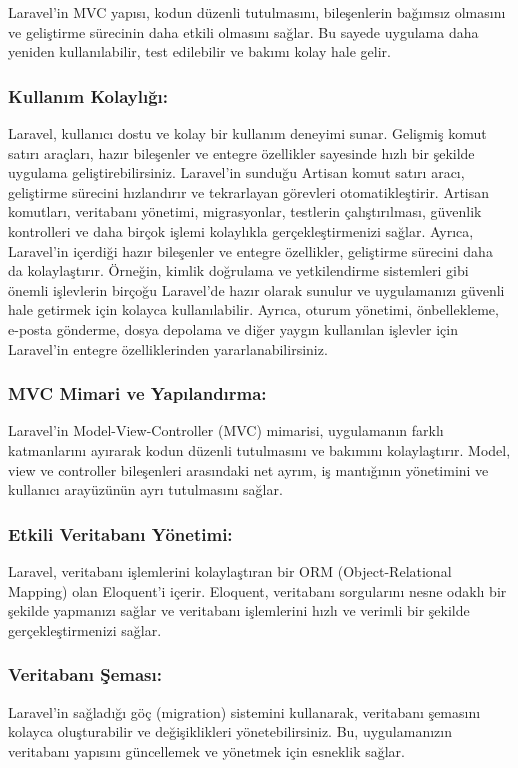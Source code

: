 Laravel'in MVC yapısı, kodun düzenli tutulmasını, bileşenlerin bağımsız olmasını ve geliştirme sürecinin daha etkili olmasını sağlar. Bu sayede uygulama daha yeniden kullanılabilir, test edilebilir ve bakımı kolay hale gelir.
\subsubsection{Kullanım Kolaylığı:}
Laravel, kullanıcı dostu ve kolay bir kullanım deneyimi sunar. Gelişmiş komut satırı araçları, hazır bileşenler ve entegre özellikler sayesinde hızlı bir şekilde uygulama geliştirebilirsiniz. Laravel'in sunduğu Artisan komut satırı aracı, geliştirme sürecini hızlandırır ve tekrarlayan görevleri otomatikleştirir. Artisan komutları, veritabanı yönetimi, migrasyonlar, testlerin çalıştırılması, güvenlik kontrolleri ve daha birçok işlemi kolaylıkla gerçekleştirmenizi sağlar.
Ayrıca, Laravel'in içerdiği hazır bileşenler ve entegre özellikler, geliştirme sürecini daha da kolaylaştırır. Örneğin, kimlik doğrulama ve yetkilendirme sistemleri gibi önemli işlevlerin birçoğu Laravel'de hazır olarak sunulur ve uygulamanızı güvenli hale getirmek için kolayca kullanılabilir. Ayrıca, oturum yönetimi, önbellekleme, e-posta gönderme, dosya depolama ve diğer yaygın kullanılan işlevler için Laravel'in entegre özelliklerinden yararlanabilirsiniz.
\subsubsection{MVC Mimari ve Yapılandırma: }
Laravel'in Model-View-Controller (MVC) mimarisi, uygulamanın farklı katmanlarını ayırarak kodun düzenli tutulmasını ve bakımını kolaylaştırır. Model, view ve controller bileşenleri arasındaki net ayrım, iş mantığının yönetimini ve kullanıcı arayüzünün ayrı tutulmasını sağlar.
\subsubsection{Etkili Veritabanı Yönetimi: }Laravel, veritabanı işlemlerini kolaylaştıran bir ORM (Object-Relational Mapping) olan Eloquent'i içerir. Eloquent, veritabanı sorgularını nesne odaklı bir şekilde yapmanızı sağlar ve veritabanı işlemlerini hızlı ve verimli bir şekilde gerçekleştirmenizi sağlar.
\subsubsection{Veritabanı Şeması:} Laravel'in sağladığı göç (migration) sistemini kullanarak, veritabanı şemasını kolayca oluşturabilir ve değişiklikleri yönetebilirsiniz. Bu, uygulamanızın veritabanı yapısını güncellemek ve yönetmek için esneklik sağlar.
